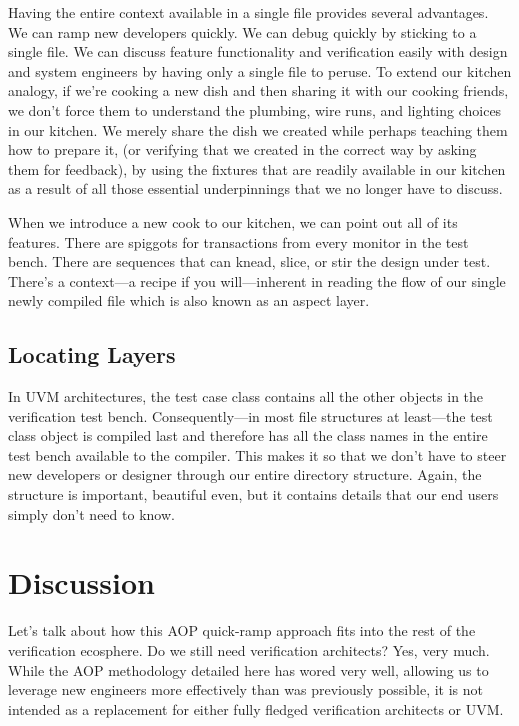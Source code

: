 \documentclass[twocolumn,letterpaper]{IEEEAerospaceCLS}  %
\begin{document}
Having the entire context available in a single file provides several advantages.  We can ramp new developers quickly. We can debug quickly by sticking to a single file. We can discuss feature functionality and verification easily with design and system engineers by having only a single file to peruse. To extend our kitchen analogy, if we're cooking a new dish and then sharing it with our cooking friends, we don't force them to understand the plumbing, wire runs, and lighting choices in our kitchen. We merely share the dish we created while perhaps teaching them how to prepare it, (or verifying that we created in the correct way by asking them for feedback), by using the fixtures that are readily available in our kitchen as a result of all those essential underpinnings that we no longer have to discuss.

When we introduce a new cook to our kitchen, we can point out all of its features. There are spiggots for transactions from every monitor in the test bench. There are sequences that can knead, slice, or stir the design under test. There's a context—a recipe if you will—inherent in reading the flow of our single newly compiled file which is also known as an aspect layer.

\subsection{Locating Layers}
In UVM architectures, the test case class contains all the other objects in the verification test bench. Consequently—in most file structures at least—the test class object is compiled last and therefore has all the class names in the entire test bench available to the compiler. This makes it so that we don't have to steer new developers or designer through our entire directory structure. Again, the structure is important, beautiful even, but it contains details that our end users simply don't need to know.

\section{Discussion}
Let's talk about how this AOP quick-ramp approach fits into the rest of the verification ecosphere. Do we still need verification architects? Yes, very much. While the AOP methodology detailed here has wored very well, allowing us to leverage new engineers more effectively than was previously possible, it is not intended as a replacement for either fully fledged verification architects or UVM. 
\end{document}
